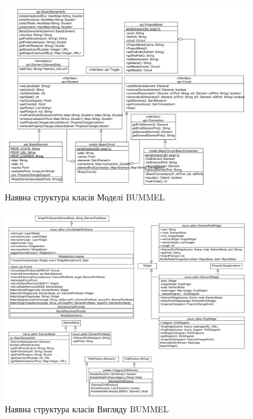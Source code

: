 \documentclass[12pt,a4paper]{article}
\begin{document}
\begin{figure}[h]
  \centering
    \includegraphics[width=0.95\textwidth]{class-diagram-model.png}
  \caption{Наявна структура класів Моделі BUMMEL\label{structModel}}
\end{figure}

\begin{figure}[h]
  \centering
    \includegraphics[width=0.95\textwidth]{class-diagram-view-NBVL.png}
  \caption{Наявна структура класів Вигляду BUMMEL\label{structView}}
\end{figure}
\end{document}
